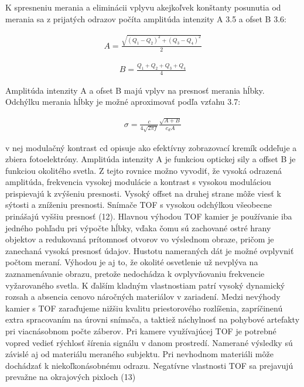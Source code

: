 K spresneniu merania a eliminácii vplyvu akejkoľvek konštanty posunutia od merania sa z
prijatých odrazov počíta amplitúda intenzity A 3.5 a ofset B 3.6:

\begin{equation}
\label{eq5}
\begin{aligned}
A=\frac{\sqrt{\left(Q_1 - Q_2\right)^2 + \left(Q_3 - Q_4\right)^2 }} {2} 
\end{aligned}
\end{equation}

\begin{equation}
\label{eq6}
\begin{aligned}
B=\frac{Q_1 + Q_2 +Q_3 + Q_4}{4} 
\end{aligned}
\end{equation}

Amplitúda intenzity A a ofset B majú vplyv na presnosť merania hĺbky. Odchýlku merania hĺbky je možné aproximovať podľa vzťahu 3.7:

\begin{equation}
\label{eq7}
\begin{aligned}
\sigma=\frac{c}{4\sqrt{2 \pi f}} \frac{\sqrt{A+B}}{c_d A}
\end{aligned}
\end{equation}

v nej modulačný kontrast cd opisuje ako efektívny zobrazovací kremík oddeľuje a zbiera fotoelektróny. Amplitúda intenzity A je funkciou optickej sily a offset B je funkciou okolitého svetla. Z tejto rovnice možno vyvodiť, že vysoká odrazená amplitúda, frekvencia vysokej modulácie a kontrast s vysokou moduláciou prispievajú k zvýšeniu presnosti. Vysoký offset na druhej strane môže viesť k sýtosti a zníženiu presnosti. Snímače TOF s vysokou odchýlkou všeobecne prinášajú vyššiu presnosť (12). Hlavnou výhodou TOF kamier je používanie iba jedného pohľadu pri výpočte hĺbky, vďaka čomu sú zachované ostré hrany objektov a redukovaná prítomnosť otvorov vo výslednom obraze, pričom je zanechaná vysoká presnosť údajov. Hustotu nameraných dát je možné ovplyvniť počtom meraní. Výhodou je aj to, že okolité osvetlenie už nevplýva na zaznamenávanie obrazu, pretože nedochádza k ovplyvňovaniu frekvencie vyžarovaného svetla. K ďalším kladným vlastnostiam patrí vysoký dynamický rozsah a absencia cenovo náročných materiálov v zariadení. Medzi nevýhody kamier s TOF zaraďujeme nižšiu kvalitu priestorového rozlíšenia, zapríčinenú extra spracovaním na úrovni snímača, a taktiež náchylnosť na pohybové artefakty pri viacnásobnom počte záberov. Pri kamere využívajúcej TOF je potrebné vopred vedieť rýchlosť šírenia signálu v danom prostredí. Namerané výsledky sú závislé aj od materiálu meraného subjektu. Pri nevhodnom materiáli môže dochádzať k niekoľkonásobnému odrazu. Negatívne vlastnosti TOF sa prejavujú prevažne na okrajových pixloch (13)


